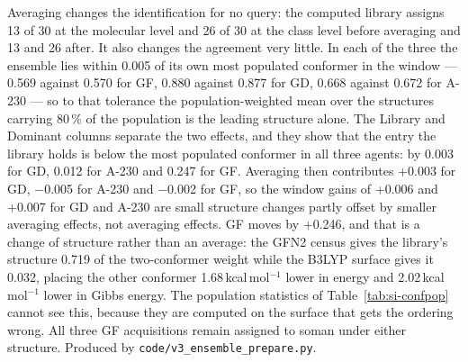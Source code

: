 \begin{table}[htbp]
\begin{flushleft}\footnotesize Averaging changes the identification for no query: the computed library assigns 13 of 30 at the molecular level and 26 of 30 at the class level before averaging and 13 and 26 after. It also changes the agreement very little. In each of the three the ensemble lies within 0.005 of its own most populated conformer in the window --- 0.569 against 0.570 for GF, 0.880 against 0.877 for GD, 0.668 against 0.672 for A-230 --- so to that tolerance the population-weighted mean over the structures carrying 80\,\% of the population is the leading structure alone. The Library and Dominant columns separate the two effects, and they show that the entry the library holds is below the most populated conformer in all three agents: by 0.003 for GD, 0.012 for A-230 and 0.247 for GF. Averaging then contributes +0.003 for GD, $-$0.005 for A-230 and $-$0.002 for GF, so the window gains of +0.006 and +0.007 for GD and A-230 are small structure changes partly offset by smaller averaging effects, not averaging effects. GF moves by +0.246, and that is a change of structure rather than an average: the GFN2 census gives the library's structure 0.719 of the two-conformer weight while the B3LYP surface gives it 0.032, placing the other conformer 1.68\,kcal\,mol$^{-1}$ lower in energy and 2.02\,kcal\,mol$^{-1}$ lower in Gibbs energy. The population statistics of Table~\ref{tab:si-confpop} cannot see this, because they are computed on the surface that gets the ordering wrong. All three GF acquisitions remain assigned to soman under either structure. Produced by \texttt{code/v3\_ensemble\_prepare.py}.\end{flushleft}
\end{table}
